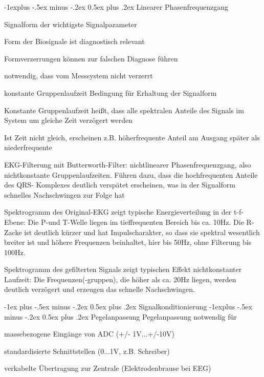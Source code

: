 \documentclass[a4paper]{article}
\makeatletter
\renewcommand{\section}{\@startsection{section}{1}{0mm}%
 {-1ex plus -.5ex minus -.2ex}%
 {0.5ex plus .2ex}%
 {\normalfont\large\bfseries}}
\renewcommand{\subsection}{\@startsection{subsection}{2}{0mm}%
 {-1explus -.5ex minus -.2ex}%
 {0.5ex plus .2ex}%
 {\normalfont\normalsize\bfseries}}
\makeatother
\begin{document}
\begin{multicols}{3}
  \subsection{Linearer Phasenfrequenzgang}\label{linearer-phasenfrequenzgang}
  \begin{itemize*}
    \item Signalform der wichtigste Signalparameter
    \item Form der Biosignale ist diagnostisch relevant
    \item Formverzerrungen können zur falschen Diagnose führen
    \item notwendig, dass vom Messsystem nicht verzerrt
    \item konstante Gruppenlaufzeit Bedingung für Erhaltung der Signalform
    \item Konstante Gruppenlaufzeit heißt, dass alle spektralen Anteile des Signals im System um gleiche Zeit verzögert werden
    \item Ist Zeit nicht gleich, erscheinen z.B. höherfrequente Anteil am Ausgang später als niederfrequente
    \item EKG-Filterung mit Butterworth-Filter: nichtlinearer Phasenfrequenzgang, also nichtkonstante Gruppenlaufzeiten. Führen dazu, dass die hochfrequenten Anteile des QRS- Komplexes deutlich verspätet erscheinen, was in der Signalform schnelles Nachschwingen zur Folge hat
    \item Spektrogramm des Original-EKG zeigt typische Energieverteilung in der t-f-Ebene: Die P-und T-Welle liegen im tieffrequenten Bereich bis ca. 10Hz. Die R-Zacke ist deutlich kürzer und hat Impulscharakter, so dass sie spektral wesentlich breiter ist und höhere Frequenzen beinhaltet, hier bis 50Hz, ohne Filterung bis 100Hz.
    \item Spektrogramm des gefilterten Signals zeigt typischen Effekt nichtkonstanter Laufzeit: Die Frequenzen(-gruppen), die höher als ca. 20Hz liegen, werden deutlich verzögert und erzeugen das schnelle Nachschwingen.
  \end{itemize*}

  \section{Signalkonditionierung}
  \subsection{Pegelanpassung}\label{pegelanpassung}
  Pegelanpassung notwendig für
  \begin{itemize*}
    \item massebezogene Eingänge von ADC (+/- 1V...+/-10V)
    \item standardisierte Schnittstellen (0...1V, z.B. Schreiber)
    \item verkabelte Übertragung zur Zentrale (Elektrodenbrause bei EEG)
  \end{itemize*}


\end{multicols}
\end{document}
